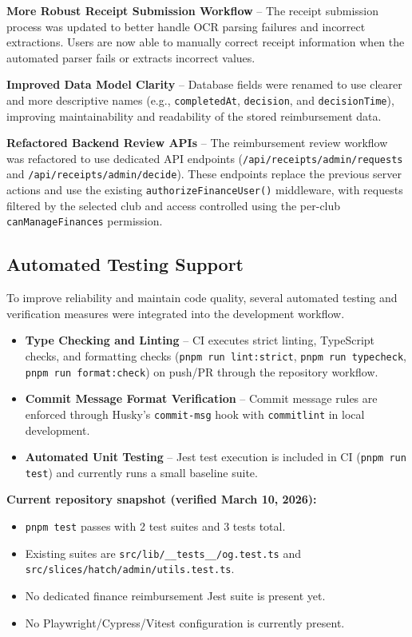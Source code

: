 \documentclass[12pt, titlepage]{article}
\begin{document}
\textbf{More Robust Receipt Submission Workflow} – The receipt submission process was updated to better handle OCR parsing failures and incorrect extractions. Users are now able to manually correct receipt information when the automated parser fails or extracts incorrect values.

\textbf{Improved Data Model Clarity} – Database fields were renamed to use clearer and more descriptive names (e.g., \texttt{completedAt}, \texttt{decision}, and \texttt{decisionTime}), improving maintainability and readability of the stored reimbursement data.

\textbf{Refactored Backend Review APIs} – The reimbursement review workflow was refactored to use dedicated API endpoints (\texttt{/api/receipts/admin/requests} and \texttt{/api/receipts/admin/decide}). These endpoints replace the previous server actions and use the existing \texttt{authorizeFinanceUser()} middleware, with requests filtered by the selected club and access controlled using the per-club \texttt{canManageFinances} permission.

\subsection{Automated Testing Support}

To improve reliability and maintain code quality, several automated testing and verification measures were integrated into the development workflow.

\begin{itemize}

\item \textbf{Type Checking and Linting} – CI executes strict linting, TypeScript checks, and formatting checks (\texttt{pnpm run lint:strict}, \texttt{pnpm run typecheck}, \texttt{pnpm run format:check}) on push/PR through the repository workflow.

\item \textbf{Commit Message Format Verification} – Commit message rules are enforced through Husky's \texttt{commit-msg} hook with \texttt{commitlint} in local development.

\item \textbf{Automated Unit Testing} – Jest test execution is included in CI (\texttt{pnpm run test}) and currently runs a small baseline suite.

\end{itemize}

\noindent\textbf{Current repository snapshot (verified March 10, 2026):}
\begin{itemize}
\item \texttt{pnpm test} passes with 2 test suites and 3 tests total.
\item Existing suites are \texttt{src/lib/\_\_tests\_\_/og.test.ts} and \texttt{src/slices/hatch/admin/utils.test.ts}.
\item No dedicated finance reimbursement Jest suite is present yet.
\item No Playwright/Cypress/Vitest configuration is currently present.
\end{itemize}
		
\end{document}
